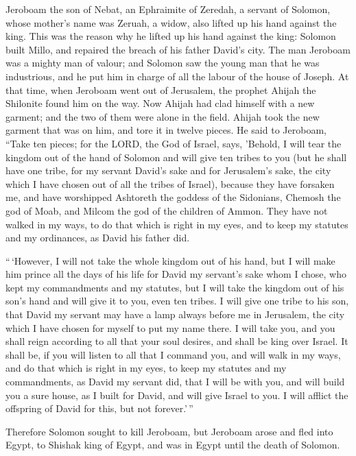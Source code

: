  Jeroboam the son of Nebat, an Ephraimite of Zeredah, a
servant of Solomon, whose mother's name was Zeruah, a widow, also lifted
up his hand against the king.  This was the reason why he
lifted up his hand against the king: Solomon built Millo, and repaired
the breach of his father David's city.  The man Jeroboam
was a mighty man of valour; and Solomon saw the young man that he was
industrious, and he put him in charge of all the labour of the house of
Joseph.  At that time, when Jeroboam went out of Jerusalem,
the prophet Ahijah the Shilonite found him on the way. Now Ahijah had
clad himself with a new garment; and the two of them were alone in the
field.  Ahijah took the new garment that was on him, and
tore it in twelve pieces.  He said to Jeroboam, ``Take ten
pieces; for the LORD, the God of Israel, says, 'Behold, I will tear the
kingdom out of the hand of Solomon and will give ten tribes to you
 (but he shall have one tribe, for my servant David's sake
and for Jerusalem's sake, the city which I have chosen out of all the
tribes of Israel),  because they have forsaken me, and have
worshipped Ashtoreth the goddess of the Sidonians, Chemosh the god of
Moab, and Milcom the god of the children of Ammon. They have not walked
in my ways, to do that which is right in my eyes, and to keep my
statutes and my ordinances, as David his father did.

 ``\,`However, I will not take the whole kingdom out of his
hand, but I will make him prince all the days of his life for David my
servant's sake whom I chose, who kept my commandments and my statutes,
 but I will take the kingdom out of his son's hand and will
give it to you, even ten tribes.  I will give one tribe to
his son, that David my servant may have a lamp always before me in
Jerusalem, the city which I have chosen for myself to put my name there.
 I will take you, and you shall reign according to all that
your soul desires, and shall be king over Israel.  It shall
be, if you will listen to all that I command you, and will walk in my
ways, and do that which is right in my eyes, to keep my statutes and my
commandments, as David my servant did, that I will be with you, and will
build you a sure house, as I built for David, and will give Israel to
you.  I will afflict the offspring of David for this, but
not forever.'\,''

 Therefore Solomon sought to kill Jeroboam, but Jeroboam
arose and fled into Egypt, to Shishak king of Egypt, and was in Egypt
until the death of Solomon.

